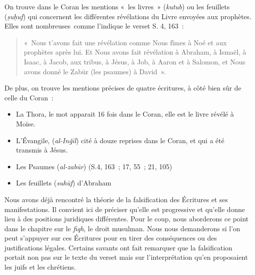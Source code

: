 On trouve dans le Coran les mentions «~les livres~» (\emph{kutub}) ou
les feuillets (\emph{ṣuḥuf}) qui concernent les différentes révélations
du Livre envoyées aux prophètes. Elles sont nombreuses~comme l'indique
le verset S. 4, 163~:

\begin{quote}
«~Nous t'avons fait une révélation comme Nous fîmes à Noé et aux
prophètes après lui. Et Nous avons fait révélation à Abraham, à Ismaël,
à Isaac, à Jacob, aux tribus, à Jésus, à Job, à Aaron et à Salomon, et
Nous avons donné le Zabūr (les psaumes) à David~».

\end{quote}

De plus, on trouve les mentions précises de quatre écritures, à côté
bien sûr de celle du Coran~:

\begin{itemize}
\item
  La Thora, le mot apparait 16 fois dans le Coran, elle est le livre
  révélé à Moïse.
\item
  L'Évangile, (\emph{al-Inǧīl}) cité à douze reprises dans le Coran, et
  qui a été transmis à Jésus.
\item
  Les Psaumes (\emph{al-zabūr}) (S.4, 163~; 17, 55~; 21, 105)
\item
  Les feuillets (\emph{suhūf}) d'Abraham
\end{itemize}


Nous avons déjà rencontré la théorie de la falsification des Écritures
et ses manifestations. Il convient ici de préciser qu'elle est
progressive et qu'elle donne lieu à des positions juridiques
différentes. Pour le coup, nous aborderons ce point dans le chapitre sur
le \emph{fiqh}, le droit musulman. Nous nous demanderons si l'on peut
s'appuyer sur ces Écritures pour en tirer des conséquences ou des
justifications légales. Certains savants ont fait remarquer que la
falsification portait non pas sur le texte du verset mais sur
l'interprétation qu'en proposaient les juifs et les chrétiens.

